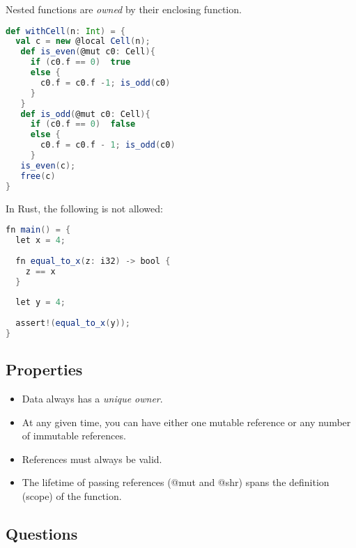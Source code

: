 Nested functions are \emph{owned} by their enclosing function.
\begin{lstlisting}[language=Scala,basicstyle=\footnotesize\ttfamily]
def withCell(n: Int) = {
  val c = new @local Cell(n);
   def is_even(@mut c0: Cell){
     if (c0.f == 0)  true
     else {
       c0.f = c0.f -1; is_odd(c0) 
     }
   }
   def is_odd(@mut c0: Cell){
     if (c0.f == 0)  false
     else {
       c0.f = c0.f - 1; is_odd(c0)
     }
   is_even(c);  
   free(c)
}
\end{lstlisting}

In Rust, the following is not allowed:
\begin{lstlisting}[language=Scala,basicstyle=\footnotesize\ttfamily]
fn main() = {
  let x = 4;
  
  fn equal_to_x(z: i32) -> bool {
    z == x
  }
  
  let y = 4;
  
  assert!(equal_to_x(y));
}
\end{lstlisting}


\clearpage
\subsection{Properties}
\begin{itemize}
\item Data always has a \emph{unique owner}.
\item At any given time, you can have either one mutable reference or any number of immutable references.
\item References must always be valid.
\item The lifetime of passing references (@mut and @shr) spans the definition (scope) of the function.
\end{itemize}

\subsection{Questions}
%
%

%

\clearpage







 


